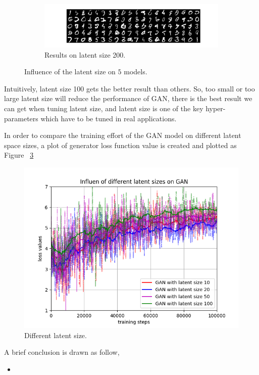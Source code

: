 \documentclass[12pt,letterpaper]{article}
\begin{document}
\begin{figure}[h]
    \medskip
    \begin{subfigure}{0.49\textwidth}
    \includegraphics[width=\linewidth]{GAN_MNIST_0_200_256.png}
    \caption{\small Results on latent size 200.} \label{fig:c}
    \end{subfigure}\hspace*{\fill}
    \caption{Influence of the latent size on $5$ models.} \label{fig:MNIST_GAN_latent}
\end{figure}

Intuitively, latent size 100 gets the better result than others. So, too small or too large latent size will reduce the performance of GAN, there is the best result we can get when tuning latent size, and latent size is one of the key hyper-parameters which have to be tuned in real applications.

In order to compare the training effort of the GAN model on different latent space sizes, a plot of generator loss function value is created and plotted as Figure ~\ref{fig:gen_latent}
\begin{figure}[h]
    \centering
    \includegraphics[width=.6\linewidth]{GAN_MNIST_latents.png}
    \caption{\small Different latent size.}
    \label{fig:gen_latent}
\end{figure}



A brief conclusion is drawn as follow,
\begin{itemize}
    \item 
\end{itemize}
 
\end{document}
